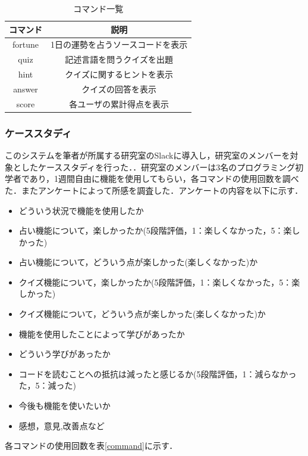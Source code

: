 \begin{table}[h]
  \centering
    \caption{コマンド一覧}
      \begin{tabular}{|c|c|} \hline
        コマンド & 説明 \\ \hline \hline
        fortune & 1日の運勢を占うソースコードを表示 \\ \hline
        quiz & 記述言語を問うクイズを出題 \\ \hline
        hint & クイズに関するヒントを表示 \\ \hline
        answer & クイズの回答を表示 \\ \hline
        score & 各ユーザの累計得点を表示 \\ \hline
      \end{tabular}
    \label{function}
  \end{table}

\subsubsection{ケーススタディ}
このシステムを筆者が所属する研究室のSlackに導入し，研究室のメンバーを対象としたケーススタディを行った．．研究室のメンバーは3名のプログラミング初学者であり，1週間自由に機能を使用してもらい，各コマンドの使用回数を調べた．またアンケートによって所感を調査した．アンケートの内容を以下に示す．

\begin{itemize}
  \item どういう状況で機能を使用したか
  \item 占い機能について，楽しかったか(5段階評価，1：楽しくなかった，5：楽しかった)
  \item 占い機能について，どういう点が楽しかった(楽しくなかった)か
  \item クイズ機能について，楽しかったか(5段階評価，1：楽しくなかった，5：楽しかった)
  \item クイズ機能について，どういう点が楽しかった(楽しくなかった)か
  \item 機能を使用したことによって学びがあったか
  \item どういう学びがあったか
  \item コードを読むことへの抵抗は減ったと感じるか(5段階評価，1：減らなかった，5：減った)
  \item 今後も機能を使いたいか
  \item 感想，意見,改善点など
\end{itemize}

各コマンドの使用回数を表\ref{command}に示す．

